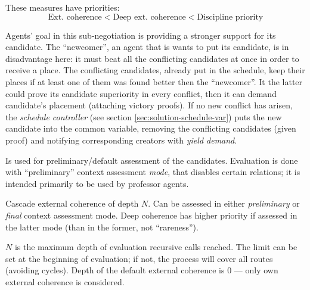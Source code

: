 \documentclass[../../ThesisDoc]{subfiles}
\begin{document}
\medskip
\noindent
These measures have priorities:
$$ \text{Ext. coherence} < \text{Deep ext. coherence} < \text{Discipline priority} $$

\medskip
\noindent
Agents' goal in this sub-negotiation is providing a stronger support for its
candidate. The ``newcomer'', an agent that is wants to put its candidate, is
in disadvantage here: it must beat all the conflicting candidates at once in
order to receive a place. The conflicting candidates, already put in the schedule,
keep their places if at least one of them was found better then the ``newcomer''.
It the latter could prove its candidate superiority in every conflict, then
it can demand candidate's placement (attaching victory proofs).
If no new conflict has arisen, the \emph{schedule controller}
(see section \ref{sec:solution-schedule-var}) puts the new candidate into the
common variable, removing the conflicting candidates (given proof) and notifying
corresponding creators with \emph{yield demand}.



Is used for preliminary/default assessment of the candidates.
Evaluation is done with ``preliminary'' context assessment \emph{mode}, that
disables certain relations; it is intended primarily to be used by professor agents.


Cascade external coherence of depth $N$. Can be assessed in either \emph{preliminary}
or \emph{final} context assessment mode. Deep coherence has higher priority if
assessed in the latter mode (than in the former, not ``rareness'').

$N$ is the maximum depth of evaluation recursive calls reached. The limit can
be set at the beginning of evaluation; if not, the process will cover all
 routes (avoiding cycles).
Depth of the default external coherence is 0 --- only own external coherence is
considered.

\bigskip
\noindent
{}

\end{document}
